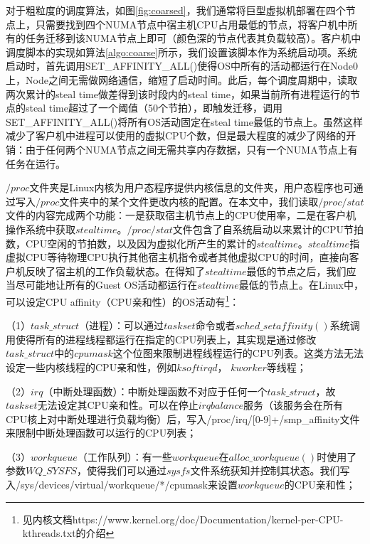 对于粗粒度的调度算法，如图\ref{fig:coarsed}，我们通常将巨型虚拟机部署在四个节点上，只需要找到四个NUMA节点中宿主机CPU占用最低的节点，将客户机中所有的任务迁移到该NUMA节点上即可（颜色深的节点代表其负载较高）。客户机中调度脚本的实现如算法\ref{algo:coarse}所示，我们设置该脚本作为系统启动项。系统启动时，首先调用SET\_AFFINITY\_ALL()使得OS中所有的活动都运行在Node0上，Node之间无需做网络通信，缩短了启动时间。此后，每个调度周期中，读取两次累计的steal time做差得到该时段内的steal time，如果当前所有进程运行的节点的steal time超过了一个阈值（50个节拍），即触发迁移，调用SET\_AFFINITY\_ALL()将所有OS活动固定在steal time最低的节点上。虽然这样减少了客户机中进程可以使用的虚拟CPU个数，但是最大程度的减少了网络的开销：由于任何两个NUMA节点之间无需共享内存数据，只有一个NUMA节点上有任务在运行。

$/proc$文件夹是Linux内核为用户态程序提供内核信息的文件夹，用户态程序也可通过写入$/proc$文件夹中的某个文件更改内核的配置。在本文中，我们读取$/proc/stat$文件的内容完成两个功能：一是获取宿主机节点上的CPU使用率，二是在客户机操作系统中获取$steal time$。$/proc/stat$文件包含了自系统启动以来累计的CPU节拍数，CPU空闲的节拍数，以及因为虚拟化所产生的累计的$steal time$。$steal time$指虚拟CPU等待物理CPU执行其他宿主机指令或者其他虚拟CPU的时间，直接向客户机反映了宿主机的工作负载状态。在得知了$steal time$最低的节点之后，我们应当尽可能地让所有的Guest OS活动都运行在$steal time$最低的节点上。在Linux中，可以设定CPU affinity（CPU亲和性）的OS活动有\footnote{见内核文档https://www.kernel.org/doc/Documentation/kernel-per-CPU-kthreads.txt的介绍}：

（1）$task\_struct$（进程）：可以通过$taskset$命令或者$sched\_setaffinity()$系统调用使得所有的进程线程都运行在指定的CPU列表上，其实现是通过修改$task\_struct$中的$cpumask$这个位图来限制进程线程运行的CPU列表。这类方法无法设定一些内核线程的CPU亲和性，例如$ksoftirqd$， $kworker$等线程；

（2）$irq$（中断处理函数）：中断处理函数不对应于任何一个$task\_struct$，故$taskset$无法设定其CPU亲和性。可以在停止$irqbalance$服务（该服务会在所有CPU核上对中断处理进行负载均衡）后，写入/proc/irq/[0-9]+/smp\_affinity文件来限制中断处理函数可以运行的CPU列表；

（3）$workqueue$（工作队列）：有一些$workqueue$在$alloc\_workqueue()$时使用了参数$WQ\_SYSFS$，使得我们可以通过$sysfs$文件系统获知并控制其状态。我们写入/sys/devices/virtual/workqueue/*/cpumask来设置$workqueue$的CPU亲和性；

